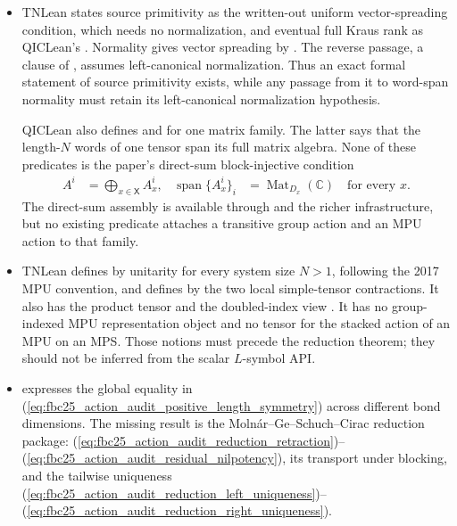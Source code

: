 \documentclass{article}
\begin{document}
\begin{itemize}
    \item TNLean states source primitivity as the written-out uniform
          vector-spreading condition, which needs no normalization, and
          eventual full Kraus rank as QICLean's .
          Normality gives vector spreading by
          .
          The reverse passage, a clause of
          ,
          assumes left-canonical normalization.  Thus an exact formal
          statement of source primitivity exists, while any passage
          from it to word-span normality must retain its left-canonical
          normalization hypothesis.

          QICLean also defines  and
           for one matrix family.  The latter
          says that the length-$N$ words of one tensor span its full matrix
          algebra.  None of these predicates is the paper's direct-sum
          block-injective condition
          \begin{align}
              A^i&=\bigoplus_{x\in\mathsf X}A_x^i,
              &\operatorname{span}\{A_x^i\}_i
                  &=\operatorname{Mat}_{D_x}(\mathbb C)
                  \quad\text{for every }x.
              \label{eq:fbc25_action_audit_block_injective_distinction}
          \end{align}
          The direct-sum assembly is available through
           and the richer
           infrastructure, but no
          existing predicate attaches a transitive group action and an MPU
          action to that family.

    \item TNLean defines  by unitarity for every
          system size $N>1$, following the 2017 MPU convention, and defines
           by the two local simple-tensor
          contractions.  It also has the product tensor
           and the doubled-index view
          .  It has no group-indexed MPU
          representation object and no tensor for the stacked action of an
          MPU on an MPS.  Those notions must precede the reduction theorem;
          they should not be inferred from the scalar $L$-symbol API.

    \item {}
          expresses the global
          equality in
          (\ref{eq:fbc25_action_audit_positive_length_symmetry}) across
          different bond dimensions.  The missing result is the
          Moln\'ar--Ge--Schuch--Cirac reduction package:
          (\ref{eq:fbc25_action_audit_reduction_retraction})--
          (\ref{eq:fbc25_action_audit_residual_nilpotency}), its transport
          under blocking, and the tailwise uniqueness
          (\ref{eq:fbc25_action_audit_reduction_left_uniqueness})--
          (\ref{eq:fbc25_action_audit_reduction_right_uniqueness}).


\end{itemize}
\end{document}
